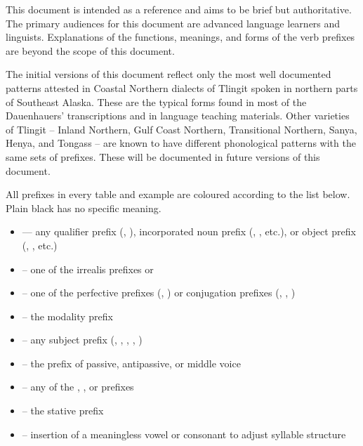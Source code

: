 \documentclass[12pt,letterpaper,landscape,oneside,article]{memoir}
\begin{document}
\begin{multicols}{2}
This document is intended as a reference and aims to be brief but authoritative.
The primary audiences for this document are advanced language learners and linguists.
Explanations of the functions, meanings, and forms of the verb prefixes are beyond the scope of this document.

The initial versions of this document reflect only the most well documented patterns attested in Coastal Northern dialects of Tlingit spoken in northern parts of Southeast Alaska.
These are the typical forms found in most of the Dauenhauers’ transcriptions and in language teaching materials.
Other varieties of Tlingit – Inland Northern, Gulf Coast Northern, Transitional Northern, Sanya, Henya, and Tongass – are known to have different phonological patterns with the same sets of prefixes.
These will be documented in future versions of this document.

All prefixes in every table and example are coloured according to the list below. Plain black has no specific meaning.

\begin{itemize}[leftmargin=0.75em]\raggedyright
\item	{}
	— any qualifier prefix (, ),
	incorporated noun prefix (, , etc.),
	or object prefix (, , etc.)
\item	{}
	– one of the irrealis prefixes  or 
\item	{}
	– one of the perfective prefixes (, )
	or conjugation prefixes (, , )
\item	{}
	– the modality prefix 
\item	{}
	– any subject prefix (, , , , )
\item	{}
	– the  prefix of passive, antipassive, or middle voice
\item	{}
	– any of the , , or  prefixes
\item	{}
	– the stative  prefix
\item	{}
	– insertion of a meaningless vowel or consonant to adjust syllable structure
\end{itemize}


\end{multicols}
\end{document}
